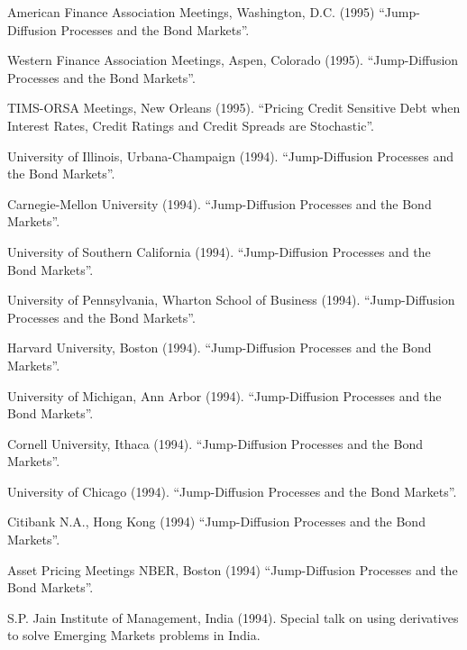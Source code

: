 \documentclass{article}
\begin{document}
\begin{etaremune}
{\item American Finance Association Meetings, Washington, D.C. (1995)
``Jump-Diffusion Processes and the Bond Markets''.

\item Western Finance Association Meetings, Aspen, Colorado (1995).
``Jump-Diffusion Processes and the Bond Markets''.

\item TIMS-ORSA Meetings, New Orleans (1995).
``Pricing Credit Sensitive Debt when Interest Rates, Credit Ratings
and Credit Spreads are Stochastic''.  

\item University of Illinois, Urbana-Champaign (1994).
``Jump-Diffusion Processes and the Bond Markets''.

\item Carnegie-Mellon University (1994).
``Jump-Diffusion Processes and the Bond Markets''.

\item University of Southern California (1994). 
``Jump-Diffusion Processes and the Bond Markets''.

\item University of Pennsylvania, Wharton School of Business (1994).
``Jump-Diffusion Processes and the Bond Markets''.

\item Harvard University, Boston (1994).
``Jump-Diffusion Processes and the Bond Markets''.

\item University of Michigan, Ann Arbor (1994).
``Jump-Diffusion Processes and the Bond Markets''.

\item Cornell University, Ithaca (1994).
``Jump-Diffusion Processes and the Bond Markets''.

\item University of Chicago (1994).
``Jump-Diffusion Processes and the Bond Markets''.

\item Citibank N.A., Hong Kong (1994)
``Jump-Diffusion Processes and the Bond Markets''.

\item Asset Pricing Meetings NBER, Boston (1994)
``Jump-Diffusion Processes and the Bond Markets''.

\item S.P. Jain Institute of Management, India (1994).
Special talk on using derivatives to solve Emerging Markets problems
in India.

}
\end{etaremune}
\end{document}
